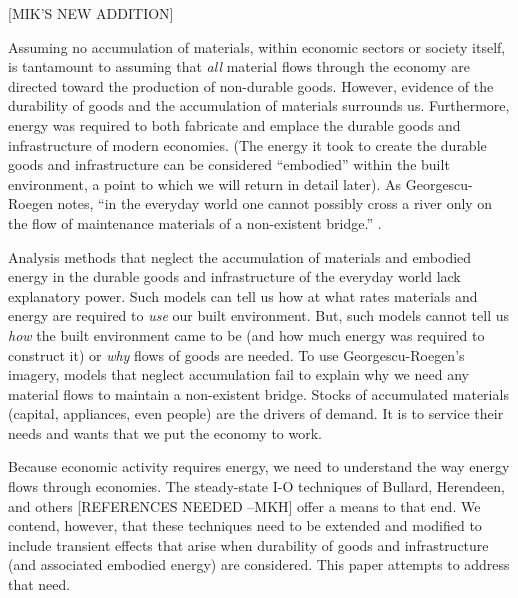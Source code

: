\documentclass[authoryear,preprint,review,12pt]{elsarticle}
\begin{document}
[MIK'S NEW ADDITION]

Assuming no accumulation of materials, within economic sectors or society itself, is tantamount to assuming that \emph{all} material flows through the economy are directed toward the production of non-durable goods. However, evidence of the durability of goods and the accumulation of materials surrounds us. Furthermore, energy was required to both fabricate and emplace the durable goods and infrastructure of modern economies. (The energy it took to create the durable goods and infrastructure can be considered ``embodied'' within the built environment, a point to which we will return in detail later). As Georgescu-Roegen notes, ``in the everyday world one cannot possibly cross a river only on the flow of maintenance materials of a non-existent bridge.'' \cite{G-R1975}. 

Analysis methods that neglect the accumulation of materials and embodied energy in the durable goods and infrastructure of the everyday world lack explanatory power. Such models can tell us how at what rates materials and energy are required to \emph{use} our built environment. But, such models cannot tell us \emph{how} the built environment came to be (and how much energy was required to construct it) or \emph{why} flows of goods are needed. To use Georgescu-Roegen's imagery, models that neglect accumulation fail to explain why we need any material flows to maintain a non-existent bridge. Stocks of accumulated materials (capital, appliances, even people) are the drivers of demand. It is to service their needs and wants that we put the economy to work. %

Because economic activity requires energy, we need to understand the way energy flows through economies. The steady-state I-O techniques of Bullard, Herendeen, and others\cite{Bullard1975,Herendeen1978} [REFERENCES NEEDED --MKH] offer a means to that end. We contend, however, that these techniques need to be extended and modified to include transient effects that arise when durability of goods and infrastructure (and associated embodied energy) are considered. This paper attempts to address that need.
\end{document}
